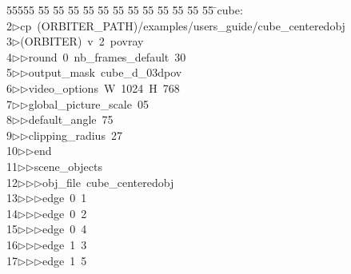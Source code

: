 %
%
\begin{tabbing}
55555 \= 55 \= 55 \= 55 \= 55 \= 55 \= 55 \= 55 \= 55 \= 55 \= 55 \= 55 \= 55 \= \>cube:\\[0pt]
2\>$\triangleright$\>cp\ (ORBITER\_PATH)/examples/users\_guide/cube\_centeredobj\ \\[0pt]
3\>$\triangleright$\>(ORBITER)\ v\ 2\ povray\ \\[0pt]
4\>$\triangleright$\>$\triangleright$\>round\ 0\ nb\_frames\_default\ 30\ \\[0pt]
5\>$\triangleright$\>$\triangleright$\>output\_mask\ cube\_d\_03dpov\ \\[0pt]
6\>$\triangleright$\>$\triangleright$\>video\_options\ W\ 1024\ H\ 768\ \\[0pt]
7\>$\triangleright$\>$\triangleright$\>global\_picture\_scale\ 05\ \\[0pt]
8\>$\triangleright$\>$\triangleright$\>default\_angle\ 75\ \\[0pt]
9\>$\triangleright$\>$\triangleright$\>clipping\_radius\ 27\ \\[0pt]
10\>$\triangleright$\>$\triangleright$\>end\ \\[0pt]
11\>$\triangleright$\>$\triangleright$\>scene\_objects\ \\[0pt]
12\>$\triangleright$\>$\triangleright$\>$\triangleright$\>obj\_file\ cube\_centeredobj\ \\[0pt]
13\>$\triangleright$\>$\triangleright$\>$\triangleright$\>edge\ 0\ 1\ \\[0pt]
14\>$\triangleright$\>$\triangleright$\>$\triangleright$\>edge\ 0\ 2\ \\[0pt]
15\>$\triangleright$\>$\triangleright$\>$\triangleright$\>edge\ 0\ 4\ \\[0pt]
16\>$\triangleright$\>$\triangleright$\>$\triangleright$\>edge\ 1\ 3\ \\[0pt]
17\>$\triangleright$\>$\triangleright$\>$\triangleright$\>edge\ 1\ 5\ \\[0pt]

\end{tabbing}

